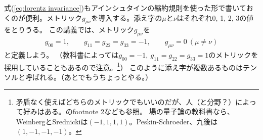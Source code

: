 \documentclass[10pt,a4paper]{jarticle}
\begin{document}
式(\ref{eq:lorentz invariance})もアインシュタインの縮約規則を使った形で書いておくのが便利。メトリック$g_{\mu\nu}$を導入する。添え字の$\mu$と$\nu$はそれぞれ0, 1, 2, 3の値をとりうる。
この講義では、メトリック$g_{\mu\nu}$を
\begin{align}
g_{00} = 1, \qquad
g_{11} = 
g_{22} = 
g_{33} = -1, \qquad
g_{\mu\nu} = 0~(\mu\neq\nu)
\end{align}
と定義しよう。
（教科書によっては$g_{00} = -1,~g_{11} = g_{22} = g_{33} = 1$のメトリックを採用していることもあるので注意。\footnote{
矛盾なく使えばどちらのメトリックでもいいのだが、人（と分野？）によって好みはある。\cite{Dreiner:2008tw}のfootnote 2なども参照。
場の量子論の教科書なら、WeinbergとSrednickiは$(-1,1,1,1)$。Peskin-Schroeder、九後は$(1,-1,-1,-1)$。}）
このように添え字が複数あるものはテンソルと呼ばれる。（あとでもうちょっとやる。）
\end{document}
